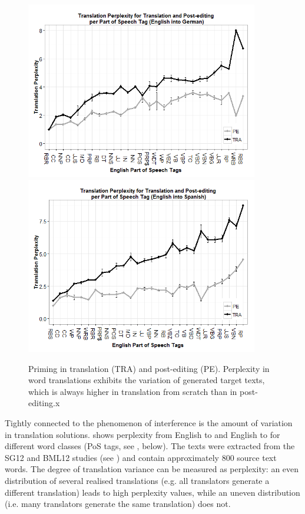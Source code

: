 \documentclass[output=paper]{LSP/langsci}
\begin{document}
\begin{figure}
\begin{center}
\includegraphics[width=4in]{figures/carl-schaefer/PerplexityPoS-DE.png} 
\includegraphics[width=4in]{figures/carl-schaefer/PerplexityPoS-ES.png} 
\end{center}

\caption{Priming in translation (TRA) and post-editing (PE). Perplexity in word translations exhibits the variation of generated target texts, which is always higher in translation from scratch than in post-editing.x}
\label{carl-schaeffer:fig:primtra2}
\end{figure}


Tightly connected to the phenomenon of interference is the amount of variation in translation solutions.  shows  perplexity from English to  and English to  for different word classes (PoS tags, see , below). The texts were extracted from the SG12 and BML12 studies (see ) and contain approximately 800 source text words. The degree of translation variance can be measured as perplexity: an even distribution of several realised translations (e.g. all translators generate a different translation) leads to high perplexity values, while an uneven distribution (i.e. many translators generate the same translation) does not. 
\end{document}
